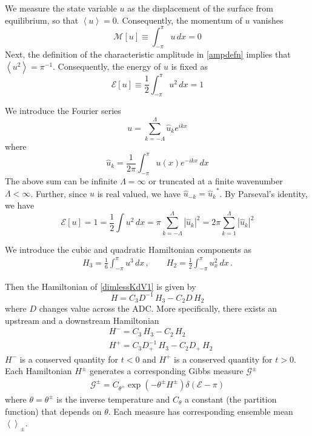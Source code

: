 \documentclass[11pt]{article}
\newcommand{\abs}[1]{\left| #1 \right|}
\newcommand{\mean}[1]{\left< #1 \right>}
\newcommand{\dx}{\, dx}
\newcommand{\drat}{D}
\newcommand{\dratdn}{\drat_+}
\newcommand{\En}{\mathcal{E}}
\newcommand{\Mo}{\mathcal{M}}
\newcommand{\uhat}{\hat{u}}
\newcommand{\Ham}{H}
\newcommand{\Hup}{\Ham^{-}}
\newcommand{\Hdn}{\Ham^{+}}
\newcommand{\Hupdn}{\Ham^{\pm}}
\newcommand{\Gibbs}{\mathcal{G}}
\newcommand{\Gupdn}{\Gibbs^{\pm}}
\newcommand{\thupdn}{\theta^{\pm}}
\begin{document}
We measure the state variable $u$ as the displacement of the surface from equilibrium, so that $\mean{u} = 0$. Consequently, the momentum of $u$ vanishes
\begin{equation}
\Mo[u] \equiv \int_{-\pi}^{\pi} u \dx = 0
\end{equation}
Next, the definition of the characteristic amplitude in \eqref{ampdefn} implies that $\mean{u^2} = \pi^{-1}$. Consequently, the energy of $u$ is fixed as
\begin{equation}
\En[u] \equiv \frac{1}{2} \int_{-\pi}^{\pi} u^2 \dx = 1
\end{equation}

We introduce the Fourier series
\begin{equation}
u = \sum_{k=-\Lambda}^{\Lambda} \uhat_k e^{i k x}
\end{equation}
where
\begin{equation}
\uhat_k = \frac{1}{2 \pi} \int_{-\pi}^{\pi} u(x) e^{-i k x} \dx
\end{equation}
The above sum can be infinite $\Lambda = \infty$ or truncated at a finite wavenumber $\Lambda < \infty$.
Further, since $u$ is real valued, we have $\uhat_{-k} = {\uhat_{k}}^*$.
By Parseval's identity, we have
\begin{equation}
\En[u] = 1 = \frac{1}{2} \int u^2 \dx = \pi \sum_{k=-\Lambda}^{\Lambda} \abs{\uhat_k}^2 = 2 \pi \sum_{k=1}^{\Lambda} \abs{\uhat_k}^2
\end{equation}

We introduce the cubic and quadratic Hamiltonian components as
\begin{align}
H_3 = \frac{1}{6} \int_{-\pi}^{\pi} u^3 \dx	\, , \qquad
H_2 = \frac{1}{2} \int_{-\pi}^{\pi} u_x^2 \dx	\, .
\end{align}

Then the Hamiltonian of \eqref{dimlessKdV1} is given by
\begin{equation}
\Ham = C_3 \drat^{-1} \, H_3 - C_2 \drat \, H_2
\end{equation}
where $\drat$ changes value across the ADC. More specifically, there exists an upstream and a downstream Hamiltonian
\begin{align}
&\Hup = C_3 \, H_3 - C_2 \, H_2 \\
&\Hdn = C_3 \dratdn^{-1} \, H_3 - C_2 \dratdn \, H_2
\end{align}
$\Hup$ is a conserved quantity for $t<0$ and $\Hdn$ is a conserved quantity for $t>0$. Each Hamiltonian $\Ham^{\pm}$ generates a corresponding Gibbs measure $\Gupdn$ 
\begin{align}
\Gupdn = C_{\thupdn} \exp(-\thupdn \Hupdn) \delta(\En - \pi)
\end{align}
where $\theta = \thupdn$ is the inverse temperature and $C_{\theta}$ a constant (the partition function) that depends on $\theta$. Each measure has corresponding ensemble mean $\mean{}_{\pm}$. 
\end{document}
